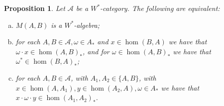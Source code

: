 \documentclass[a4paper,11pt]{article}
\theoremstyle{plain}
\newtheorem{proposition}{Proposition}[section]
\theoremstyle{remark}
\newcommand{\mc}[1]{\mathcal{#1}}
\begin{document}
\begin{proposition}\label{prop:via_bimod}
Let $\mc A$ be a $W^*$-category.  The following are equivalent:
\begin{enumerate}[(a)]
  \item\label{prop:via_bimod:one}
  $M(A,B)$ is a $W^*$-algebra;
  \item\label{prop:via_bimod:two}
  for each $A,B\in\mc A, \omega\in A_*$ and $x\in\hom(B,A)$ we have that $\omega\cdot x \in \hom(A,B)_*$, and for $\omega\in\hom(A,B)_*$ we have that $\omega^* \in \hom(B,A)_*$;
  \item\label{prop:via_bimod:three}
  for each $A,B\in\mc A$, with $A_1, A_2 \in \{A,B\}$, with $x\in \hom(A, A_1), y\in\hom(A_2, A), \omega \in A_*$ we have that $x\cdot\omega\cdot y \in \hom(A_1, A_2)_*$.
\end{enumerate}
\end{proposition}
\end{document}
